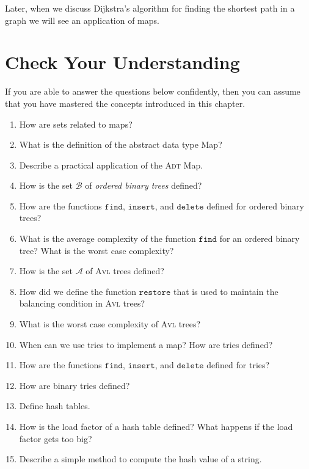 Later, when we discuss Dijkstra's algorithm for finding the shortest path in a graph we will see an
application of maps.

\section{Check Your Understanding}
If you are able to answer the questions below confidently, then you can assume that you have mastered the concepts
introduced in this chapter.
\begin{enumerate}
\item How are sets related to maps?
\item What is the definition of the abstract data type Map?
\item Describe a practical application of the \textsc{Adt} Map.
\item How is the set $\mathcal{B}$ of \emph{ordered binary trees} defined?
\item How are the functions $\mathtt{find}$, $\mathtt{insert}$, and $\mathtt{delete}$ defined for ordered
      binary trees?
\item What is the average complexity of the function $\mathtt{find}$ for an ordered binary tree?
      What is the worst case complexity?
\item How is the set $\mathcal{A}$ of \textsc{Avl} trees defined?
\item How did we define the function $\mathtt{restore}$ that is used to maintain the balancing condition
      in \textsc{Avl} trees?
\item What is the worst case complexity of \textsc{Avl} trees?
\item When can we use tries to implement a map? How are tries defined?
\item How are the functions $\mathtt{find}$, $\mathtt{insert}$, and $\mathtt{delete}$ defined for tries?
\item How are binary tries defined?
\item Define hash tables.
\item How is the load factor of a hash table defined?
      What happens if the load factor gets too big?
\item Describe a simple method to compute the hash value of a string.
\end{enumerate}

